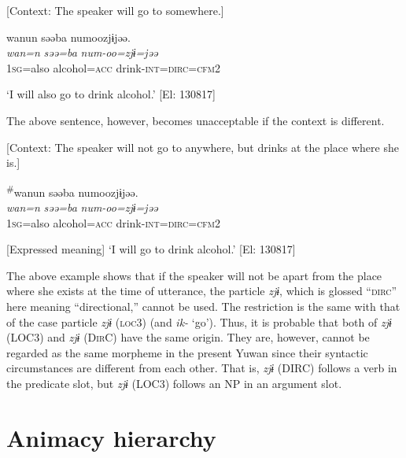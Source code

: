 \begin{table}
\ea\label{ex:6-90}
  [Context: The speaker will go to somewhere.]

{\TM}
\glll wanun  səəba  numoozjɨjəə.\\
\textit{wan=n}  \textit{səə=ba}  \textit{num-oo=zjɨ=jəə}\\

    1\textsc{sg}=also  alcohol=\textsc{acc}  drink-\textsc{int}=\textsc{dirc}=\textsc{cfm}2

\glt    ‘I will also go to drink alcohol.’ [El: 130817]

The above sentence, however, becomes unacceptable if the context is different.

\ea\label{ex:6-91}
  [Context: The speaker will not go to anywhere, but drinks at the place where she is.]

{\TM}
\glll \textsuperscript{\#}wanun  səəba  numoozjɨjəə.\\
\textit{wan=n}  \textit{səə=ba}  \textit{num-oo=zjɨ=jəə}\\

    1\textsc{sg}=also  alcohol=\textsc{acc}  drink-\textsc{int}=\textsc{dirc}=\textsc{cfm}2

    [Expressed meaning] ‘I will go to drink alcohol.’ [El: 130817]

The above example shows that if the speaker will not be apart from the place where she exists at the time of utterance, the particle \textit{zjɨ}, which is glossed “\textsc{dirc}” here meaning “directional,” cannot be used. The restriction is the same with that of the case particle \textit{zjɨ} (\textsc{loc}3) (and \textit{ik-} ‘go’). Thus, it is probable that both of \textit{zjɨ} (LOC3) and \textit{zjɨ} (D\textsc{ir}C) have the same origin. They are, however, cannot be regarded as the same morpheme in the present Yuwan since their syntactic circumstances are different from each other. That is, \textit{zjɨ} (DIRC) follows a verb in the predicate slot, but \textit{zjɨ} (LOC3) follows an NP in an argument slot.

\section{Animacy hierarchy}


\end{table}
